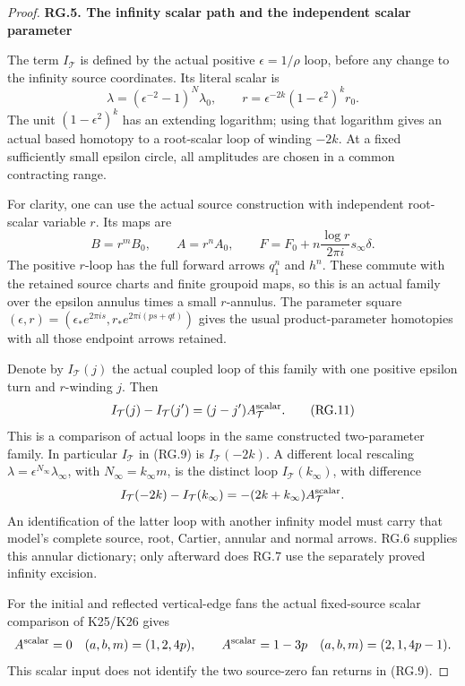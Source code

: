 \begin{proof}
\par

\medskip\noindent\textbf{RG.5. The infinity scalar path and the independent scalar parameter}

\par\nobreak

The term \(I_{\mathcal T}\) is defined by the actual positive
\(\epsilon=1/\rho\) loop, before any change to the infinity
source coordinates. Its literal scalar is
\[
 \lambda=(\epsilon^{-2}-1)^N\lambda_0,\qquad
 r=\epsilon^{-2k}(1-\epsilon^2)^k r_0.                \tag{RG.10}
\]
The unit \((1-\epsilon^2)^k\) has an extending logarithm;
using that logarithm gives an actual based homotopy to a
root-scalar loop of winding \(-2k\). At a fixed sufficiently
small epsilon circle, all amplitudes are chosen in a common
contracting range.

For clarity, one can use the actual source construction with
independent root-scalar variable \(r\). Its maps are
\[
 B=r^mB_0,\qquad A=r^nA_0,\qquad
 F=F_0+n\frac{\log r}{2\pi i}s_\infty\delta.
\]
The positive \(r\)-loop has the full forward arrows
\(q_1^n\) and \(h^n\). These commute with the retained source
charts and finite groupoid maps, so this is an actual family
over the epsilon annulus times a small \(r\)-annulus. The
parameter square \((\epsilon,r)=(\epsilon_*e^{2\pi is},
r_*e^{2\pi i(ps+qt)})\) gives the usual product-parameter
homotopies with all those endpoint arrows retained.

Denote by \(I_{\mathcal T}(j)\) the actual coupled loop of this
family with one positive epsilon turn and \(r\)-winding \(j\).
Then
\[
 I_{\mathcal T}(j)-I_{\mathcal T}(j')
       =(j-j')A^{\rm scalar}_{\mathcal T}.             \tag{RG.11}
\]
This is a comparison of actual loops in the same constructed
two-parameter family. In particular \(I_{\mathcal T}\) in
(RG.9) is \(I_{\mathcal T}(-2k)\). A different local rescaling
\(\lambda=\epsilon^{N_\infty}\lambda_\infty\), with
\(N_\infty=k_\infty m\), is the distinct loop
\(I_{\mathcal T}(k_\infty)\), with difference
\[
 I_{\mathcal T}(-2k)-I_{\mathcal T}(k_\infty)
       =-(2k+k_\infty)A^{\rm scalar}_{\mathcal T}.
\]
An identification of the latter loop with another infinity
model must carry that model's complete source, root,
Cartier, annular and normal arrows. RG.6 supplies this
annular dictionary; only afterward does RG.7 use the
separately proved infinity excision.

For the initial and reflected vertical-edge fans the actual
fixed-source scalar comparison of K25/K26 gives
\[
 A^{\rm scalar}=0\quad(a,b,m)=(1,2,4p),\qquad
 A^{\rm scalar}=1-3p\quad(a,b,m)=(2,1,4p-1).
\]
This scalar input does not identify the two source-zero fan
returns in (RG.9).


\end{proof}
